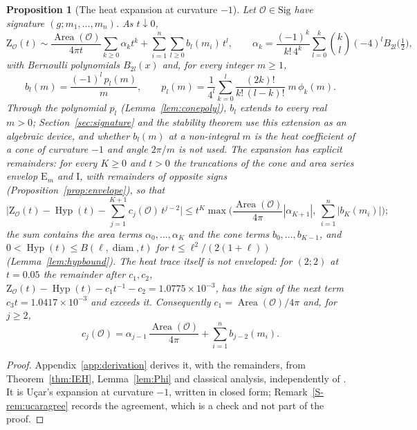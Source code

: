 \documentclass[pdflatex,sn-mathphys-num]{sn-jnl}
\theoremstyle{thmstyleone}%
\newtheorem{proposition}[theorem]{Proposition}%
\theoremstyle{thmstylethree}%
\newcommand{\Orb}{\mathcal{O}}
\newcommand{\Sig}{\mathrm{Sig}}
\newcommand{\Area}{\operatorname{Area}}
\newcommand{\Hyp}{\operatorname{Hyp}}
\newcommand{\diam}{\operatorname{diam}}
\newcommand{\cZ}{\mathrm{Z}}
\newcommand{\sref}[1]{\ref*{S-#1}}%
\begin{document}
\begin{proposition}[The heat expansion at curvature $-1$]\label{prop:heatinput}
Let $\Orb\in\Sig$ have signature $(g;m_1,\dots,m_n)$. As $t\downarrow0$,
\[
  \cZ_\Orb(t)\sim\frac{\Area(\Orb)}{4\pi t}\sum_{k\ge0}\alpha_kt^k+\sum_{i=1}^n\sum_{l\ge0}b_l(m_i)\,t^l,
  \qquad \alpha_k=\frac{(-1)^k}{k!\,4^k}\sum_{l=0}^k\binom kl(-4)^lB_{2l}\big(\tfrac12\big),
\]
with Bernoulli polynomials $B_{2l}(x)$ and, for every integer $m\ge1$,
\begin{equation}\label{eq:bl}
  b_l(m)=\frac{(-1)^l\,p_l(m)}{m},\qquad
  p_l(m)=\frac1{4^l}\sum_{k=0}^{l}\frac{(2k)!}{k!\,(l-k)!}\;m\,\phi_k(m).
\end{equation}
Through the polynomial $p_l$ (Lemma~\ref{lem:conepoly}), $b_l$ extends to every real $m>0$; Section~\ref{sec:signature} and the stability theorem use this extension as an algebraic device, and whether $b_l(m)$ at a non-integral $m$ is the heat coefficient of a cone of curvature $-1$ and angle $2\pi/m$ is not used. The expansion has explicit remainders: for every $K\ge0$ and $t>0$ the truncations of the cone and area series envelop $\mathrm E_m$ and $\mathrm I$, with remainders of opposite signs (Proposition~\ref{prop:envelope}), so that
\begin{equation}\label{eq:Grem}
  \Big|\cZ_\Orb(t)-\Hyp(t)-\sum_{j=1}^{K+1}c_j(\Orb)\,t^{j-2}\Big|\le t^K\max\Big(\frac{\Area(\Orb)}{4\pi}|\alpha_{K+1}|,\ \sum_{i=1}^n|b_K(m_i)|\Big);
\end{equation}
the sum contains the area terms $\alpha_0,\dots,\alpha_K$ and the cone terms $b_0,\dots,b_{K-1}$, and $0<\Hyp(t)\le B(\ell,\diam,t)$ for $t\le\ell^2/(2(1+\ell))$ (Lemma~\ref{lem:hypbound}). The heat trace itself is not enveloped: for $(2;2)$ at $t=0.05$ the remainder after $c_1,c_2$, $\cZ_\Orb(t)-\Hyp(t)-c_1t^{-1}-c_2=1.0775\times10^{-3}$, has the sign of the next term $c_3t=1.0417\times10^{-3}$ and exceeds it. Consequently $c_1=\Area(\Orb)/4\pi$ and, for $j\ge2$,
\begin{equation}\label{eq:cj}
  c_j(\Orb)=\alpha_{j-1}\,\frac{\Area(\Orb)}{4\pi}+\sum_{i=1}^nb_{j-2}(m_i).
\end{equation}
\end{proposition}

\begin{proof}
Appendix~\ref{app:derivation} derives it, with the remainders, from Theorem~\ref{thm:IEH}, Lemma~\ref{lem:Phi} and classical analysis, independently of \cite{dggw2008,ucar2017}. It is U\c{c}ar's expansion \cite[Thm~4.20(ii), (4.35)]{ucar2017} at curvature $-1$, written in closed form; Remark~\sref{rem:ucaragree} records the agreement, which is a check and not part of the proof.
\end{proof}
\end{document}
